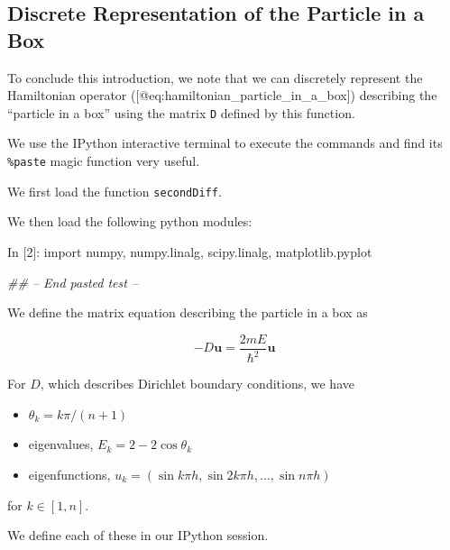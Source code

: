 \documentclass[12pt,]{book}
\newenvironment{Shaded}{}{}
\newcommand{\DecValTok}[1]{\textcolor[rgb]{0.25,0.63,0.44}{{#1}}}
\newcommand{\ImportTok}[1]{{#1}}
\newcommand{\CommentTok}[1]{\textcolor[rgb]{0.38,0.63,0.69}{\textit{{#1}}}}
\newcommand{\NormalTok}[1]{{#1}}
\providecommand{\tightlist}{%
  \setlength{\itemsep}{0pt}\setlength{\parskip}{0pt}}
\begin{document}
\vfill

\pagebreak

\vfill

\pagebreak

\subsection{Discrete Representation of the Particle in a
Box}\label{discrete-representation-of-the-particle-in-a-box}

To conclude this introduction, we note that we can discretely represent
the Hamiltonian operator ({[}@eq:hamiltonian\_particle\_in\_a\_box{]})
describing the ``particle in a box'' using the matrix \texttt{D} defined
by this function.

We use the IPython interactive terminal to execute the commands and find
its \texttt{\%paste} magic function very useful.

We first load the function \texttt{secondDiff}.

We then load the following python modules:

\begin{Shaded}
\begin{Highlighting}[]
\NormalTok{In [}\DecValTok{2}\NormalTok{]: }\ImportTok{import} \NormalTok{numpy, numpy.linalg, scipy.linalg, matplotlib.pyplot}

\CommentTok{## -- End pasted test --}
\end{Highlighting}
\end{Shaded}

We define the matrix equation describing the particle in a box as

\begin{equation}-D\mathbf{u}=\frac{2mE}{\hbar^2} \mathbf{u}\label{eq:matrix_eqn_particle_in_a_box}\end{equation}

For \(D\), which describes Dirichlet boundary conditions, we have

\begin{itemize}
\tightlist
\item
  \(\theta_k = k\pi/(n+1)\)
\item
  eigenvalues, \(E_k = 2-2\cos\theta_k\)
\item
  eigenfunctions,
  \(u_k = (\sin k\pi h, \sin 2k\pi h, \dots, \sin n\pi h)\)
\end{itemize}

for \(k\in[1,n]\).

We define each of these in our IPython session.
\end{document}
